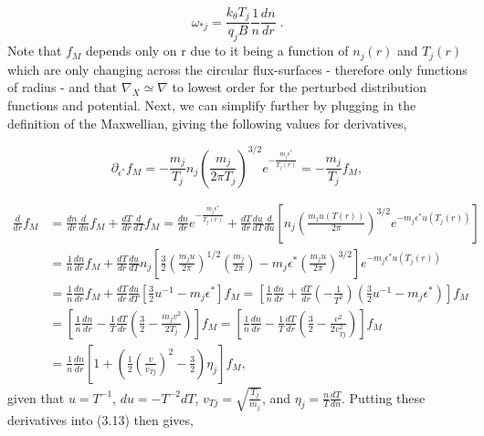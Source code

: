 \documentclass[12pt]{article}
\numberwithin{equation}{section}
\begin{document}
   \begin{equation}
      \omega_{*j} = \frac{k_\theta T_j}{q_j B}\frac{1}{n}\frac{dn}{dr}\;.
   \end{equation}
Note that $f_M$ depends only on r due to it being a function of $n_j(r)$ and $T_j(r)$ which are only changing across the circular
flux-surfaces - therefore only functions of radius - and that $\nabla_X \simeq \nabla$ to lowest order for the perturbed distribution
functions and potential. Next, we can simplify further by plugging in the definition of the Maxwellian, giving the following values for
derivatives,

   \begin{equation}
      \partial_{\epsilon^*}f_M = -\frac{m_j}{T_j}n_j\left(\frac{m_j}{2\pi T_j}\right)^{3/2}e^{-\frac{m_j \epsilon^*}{T_j(r)}} =
                                 -\frac{m_j}{T_j}f_M,
   \end{equation}
   
   \begin{equation}
   \begin{aligned}
      \frac{d}{dr}f_M &= \frac{dn}{dr}\frac{d}{dn}f_M + \frac{dT}{dr}\frac{d}{dT}f_M = 
                         \frac{dn}{dr}e^{-\frac{m_j \epsilon^*}{T_j(r)}} + 
                         \frac{dT}{dr}\frac{du}{dT}\frac{d}{du}[n_j\left(\frac{m_j u(T(r))}{2\pi}\right)^{3/2}e^{-m_j \epsilon^* u(T_j(r))}] \\
                      &= \frac{1}{n}\frac{dn}{dr}f_M + \frac{dT}{dr}\frac{du}{dT}n_j[\frac{3}{2}\left(\frac{m_ju}{2\pi}\right)^{1/2}
                         \left(\frac{m_j}{2\pi}\right) - m_j\epsilon^*\left(\frac{m_ju}{2\pi}\right)^{3/2}]e^{-m_j \epsilon^* u(T_j(r))} \\
                      &= \frac{1}{n}\frac{dn}{dr}f_M + \frac{dT}{dr}\frac{du}{dT}[\frac{3}{2}u^{-1} - m_j\epsilon^*]f_M
                       = [\frac{1}{n}\frac{dn}{dr} + \frac{dT}{dr}(-\frac{1}{T^2})(\frac{3}{2}u^{-1} - m_j\epsilon^*)]f_M \\
                      &= [\frac{1}{n}\frac{dn}{dr} - \frac{1}{T}\frac{dT}{dr}(\frac{3}{2} - \frac{m_jv^2}{2T_j})]f_M
                       = [\frac{1}{n}\frac{dn}{dr} - \frac{1}{T}\frac{dT}{dr}(\frac{3}{2} - \frac{v^2}{2v_{Tj}^2})]f_M \\
                      &= \frac{1}{n}\frac{dn}{dr}[1 + (\frac{1}{2}\left(\frac{v}{v_{Tj}}\right)^2 - \frac{3}{2})\eta_j]f_M,
   \end{aligned}
   \end{equation}
given that $u = T^{-1}$, $du = -T^{-2}dT$, $v_{Tj} = \sqrt{\frac{T_j}{m_j}}$, and $\eta_j = \frac{n}{T}\frac{dT}{dn}$. Putting these
derivatives into (3.13) then gives,
   
\end{document}
